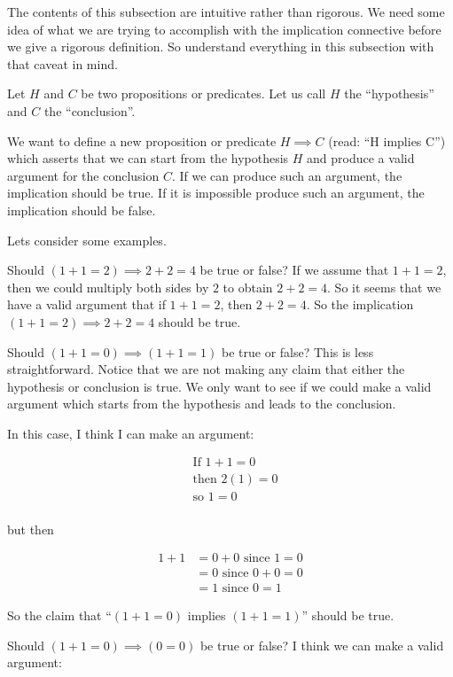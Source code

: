 The contents of this subsection are intuitive rather than rigorous.  We need some idea of what we are trying to accomplish with the implication connective before we give a rigorous definition.  So understand everything in this subsection with that caveat in mind.

Let $H$ and $C$ be two propositions or predicates. Let us call $H$ the ``hypothesis'' and $C$ the ``conclusion''.

We want to define a new proposition or predicate $H \implies C$ (read: ``H implies C'') which asserts that we can start from the hypothesis $H$ and produce a valid argument for the conclusion $C$.  If we can produce such an argument, the implication should be true.  If it is impossible produce such an argument, the implication should be false.

Lets consider some examples.

Should $(1+1 = 2) \implies 2+2 = 4$ be true or false?  If we assume that $1+1 = 2$, then we could multiply both sides by $2$ to obtain $2+2 = 4$.  So it seems that we have a valid argument that if $1+1 = 2$, then $2+2 = 4$.  So the implication $(1+1 = 2) \implies 2+2 = 4$ should be true.

Should $(1+1 = 0) \implies (1+1 = 1)$ be true or false?  This is less straightforward.  Notice that we are not making any claim that either the hypothesis or conclusion is true.  We only want to see if we could make a valid argument which starts from the hypothesis and leads to the conclusion.

In this case, I think I can make an argument:

\begin{align*}
&\textrm{If } 	1+1 =0\\
&\textrm{then } 	2(1) = 0\\
&\textrm{so }	1 =0\\ 
\end{align*}

but then

\begin{align*}
	1+ 1 & = 0+ 0 \textrm{ since $1=0$}\\
	&= 0 \textrm{ since $0+0 =0$}\\
	&= 1 \textrm{ since $0 = 1$}
\end{align*}

So the claim that ``$(1+1 = 0)$ implies $(1+1 = 1)$'' should be true.

Should $(1+1 = 0) \implies (0 = 0)$ be true or false? I think we can make a valid argument:


